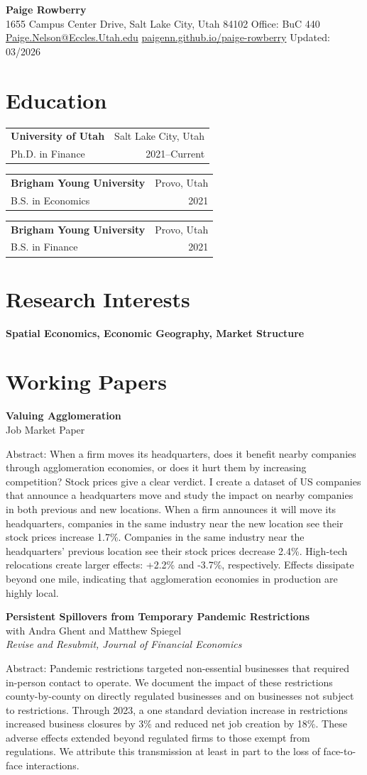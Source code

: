 \documentclass[11pt]{article}
\makeatletter
\newcommand{\eduentry}[4]{%
\begin{tabular*}{\textwidth}{@{}l@{\extracolsep{\fill}}r@{}}
\textbf{#1} & #2 \\
#3 & #4 \\
\end{tabular*}\vspace{0.6em}
}
\newcommand{\cvsection}[2][12]{%
\Needspace{#1\baselineskip}%
\section*{#2}%
}
\newenvironment{paperentry}{%
\Needspace{24\baselineskip}%
\samepage
}{%
\vspace{0.6em}%
\par
}
\makeatother
\begin{document}
\pagestyle{plain}

\begin{center}
{\LARGE \textbf{Paige Rowberry}}\\[0.3em]
1655 Campus Center Drive, Salt Lake City, Utah 84102 \textbar{} Office: BuC 440\\
\href{mailto:Paige.Nelson@Eccles.Utah.edu}{Paige.Nelson@Eccles.Utah.edu} \textbar{}
\href{https://paigenn.github.io/paige-rowberry/}{paigenn.github.io/paige-rowberry} \textbar{} Updated: 03/2026
\end{center}

\cvsection{Education}
\eduentry{University of Utah}{Salt Lake City, Utah}{Ph.D. in Finance}{2021--Current}
\eduentry{Brigham Young University}{Provo, Utah}{B.S. in Economics}{2021}
\eduentry{Brigham Young University}{Provo, Utah}{B.S. in Finance}{2021}

\cvsection{Research Interests}
\textbf{Spatial Economics, Economic Geography, Market Structure}

\cvsection{Working Papers}
\begin{paperentry}
\textbf{Valuing Agglomeration}\\
Job Market Paper

Abstract: When a firm moves its headquarters, does it benefit nearby companies through agglomeration economies, or does it hurt them by increasing competition? Stock prices give a clear verdict. I create a dataset of US companies that announce a headquarters move and study the impact on nearby companies in both previous and new locations. When a firm announces it will move its headquarters, companies in the same industry near the new location see their stock prices increase 1.7\%. Companies in the same industry near the headquarters' previous location see their stock prices decrease 2.4\%. High-tech relocations create larger effects: +2.2\% and -3.7\%, respectively. Effects dissipate beyond one mile, indicating that agglomeration economies in production are highly local.
\end{paperentry}

\begin{paperentry}
\textbf{Persistent Spillovers from Temporary Pandemic Restrictions}\\
with Andra Ghent and Matthew Spiegel\\
\emph{Revise and Resubmit, Journal of Financial Economics}

Abstract: Pandemic restrictions targeted non-essential businesses that required in-person contact to operate. We document the impact of these restrictions county-by-county on directly regulated businesses and on businesses not subject to restrictions. Through 2023, a one standard deviation increase in restrictions increased business closures by 3\% and reduced net job creation by 18\%. These adverse effects extended beyond regulated firms to those exempt from regulations. We attribute this transmission at least in part to the loss of face-to-face interactions.
\end{paperentry}
\end{document}
